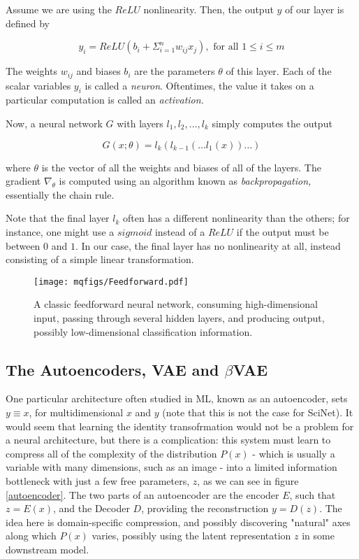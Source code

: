 \documentclass[aps,prl,preprint,groupedaddress]{revtex4-1}
\begin{document}
Assume we are using the $ReLU$ nonlinearity. Then, the output $y$ of our layer is defined by 

$$ y_i = ReLU\left( b_i + \Sigma_{i = 1}^n w_{ij}x_j \right), \text{ for all } 1 \le i \le m $$

The weights $w_{ij}$ and biases $b_i$ are the parameters $\theta$ of this layer. Each of the scalar variables $y_i$ is called a \emph{neuron}. Oftentimes, the value it takes on a particular computation is called an \emph{activation.}

Now, a neural network $G$ with layers $l_1, l_2, \ldots , l_k$ simply computes the output

$$ G(x; \theta) = l_k(l_{k -1} ( \ldots l_1(x))\ldots )$$

where $\theta$ is the vector of all the weights and biases of all of the layers. The gradient $\nabla_{\theta}$ is computed using an algorithm known as \emph{backpropagation,} essentially the chain rule. 

Note that the final layer $l_k$ often has a different nonlinearity than the others; for instance, one might use a $sigmoid$ instead of a $ReLU$ if the output must be between $0$ and $1$. In our case, the final layer has no nonlinearity at all, instead consisting of a simple linear transformation.

\begin{figure}[h]
   \centering
   \texttt{[image: mqfigs/Feedforward.pdf]}
   \caption{\label{feedforward} A classic feedforward neural network, consuming high-dimensional input, passing through several hidden layers, and producing output, possibly low-dimensional classification information.}
\end{figure}

\subsection{ The Autoencoders, VAE and $\beta$VAE}

One particular architecture often studied in ML, known as an autoencoder, 
sets $y \equiv x$, for multidimensional $x$ and $y$ (note that this is not the case for SciNet). 
It would seem that learning the identity transofrmation would not be a problem for a neural architecture, 
but there is a complication: 
this system must learn to compress all of the complexity of the distribution $P(x)$ - 
which is usually a variable with many dimensions, such as an image - 
into a limited information bottleneck with just a few free parameters, $z$, 
as we can see in figure \ref{autoencoder}. 
The two parts of an autoencoder are the encoder $E$, such that $z = E(x)$, and the Decoder $D$, 
providing the reconstruction $y = D(z)$. 
The idea here is domain-specific compression, 
and possibly discovering "natural" axes along which $P(x)$ varies, 
possibly using the latent representation $z$ in some downstream model.
\end{document}
